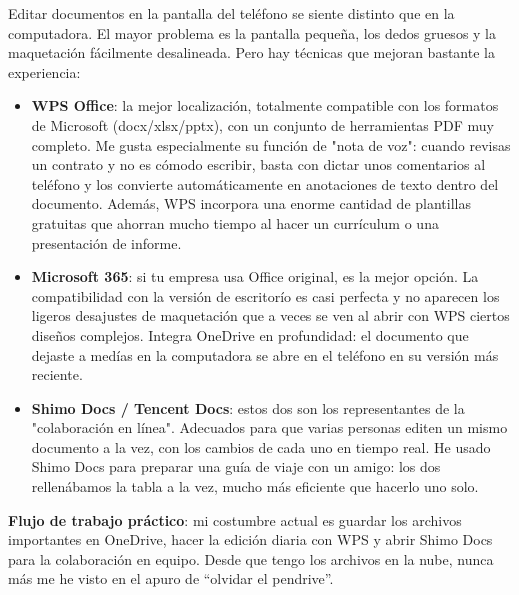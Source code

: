 


Editar documentos en la pantalla del teléfono se siente distinto que en la computadora. El mayor problema es la pantalla pequeña, los dedos gruesos y la maquetación fácilmente desalineada. Pero hay técnicas que mejoran bastante la experiencia:

\begin{itemize}
  \item \textbf{WPS Office}: la mejor localización, totalmente compatible con los formatos de Microsoft (docx/xlsx/pptx), con un conjunto de herramientas PDF muy completo. Me gusta especialmente su función de "nota de voz": cuando revisas un contrato y no es cómodo escribir, basta con dictar unos comentarios al teléfono y los convierte automáticamente en anotaciones de texto dentro del documento. Además, WPS incorpora una enorme cantidad de plantillas gratuitas que ahorran mucho tiempo al hacer un currículum o una presentación de informe.
  \item \textbf{Microsoft 365}: si tu empresa usa Office original, es la mejor opción. La compatibilidad con la versión de escritorío es casi perfecta y no aparecen los ligeros desajustes de maquetación que a veces se ven al abrir con WPS ciertos diseños complejos. Integra OneDrive en profundidad: el documento que dejaste a medías en la computadora se abre en el teléfono en su versión más reciente.
  \item \textbf{Shimo Docs / Tencent Docs}: estos dos son los representantes de la "colaboración en línea". Adecuados para que varias personas editen un mismo documento a la vez, con los cambios de cada uno en tiempo real. He usado Shimo Docs para preparar una guía de viaje con un amigo: los dos rellenábamos la tabla a la vez, mucho más eficiente que hacerlo uno solo.
\end{itemize}

\textbf{Flujo de trabajo práctico}: mi costumbre actual es guardar los archivos importantes en OneDrive, hacer la edición diaria con WPS y abrir Shimo Docs para la colaboración en equipo. Desde que tengo los archivos en la nube, nunca más me he visto en el apuro de “olvidar el pendrive”.

